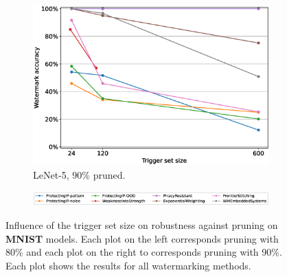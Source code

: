 \begin{figure}
\begin{subfigure}{0.4\linewidth}
        \includegraphics[width=\linewidth]{images/pruning/lenet5_pruning_per_arch_09.eps}
        \caption{LeNet-5, 90\% pruned.}
        \label{fig:pruning-0.9-lenet5}
    \end{subfigure}
    
    \begin{subfigure}{\linewidth}
    \centering
    \includegraphics[width=0.7\linewidth]{images/pruning/legend_pruning_per_arch.eps}
    \end{subfigure}
    
    \caption{Influence of the trigger set size on robustness against pruning on \textbf{MNIST} models. Each plot on the left corresponds pruning with 80\% and each plot on the right to corresponds pruning with 90\%. Each plot shows the results for all watermarking methods.}
    \label{fig:pruning-mnistmodels-perarch}
\end{figure}
